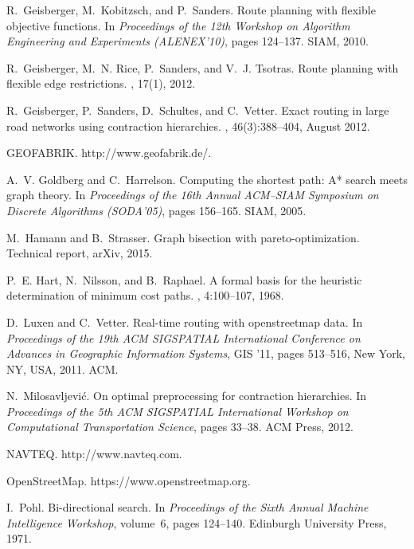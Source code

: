\documentclass{sig-alternate}
\begin{document}
\begin{thebibliography}{10}
R.~Geisberger, M.~Kobitzsch, and P.~Sanders.
\newblock Route planning with flexible objective functions.
\newblock In {\em Proceedings of the 12th Workshop on Algorithm Engineering and
  Experiments (ALENEX'10)}, pages 124--137. SIAM, 2010.

R.~Geisberger, M.~N. Rice, P.~Sanders, and V.~J. Tsotras.
\newblock Route planning with flexible edge restrictions.
, 17(1), 2012.

R.~Geisberger, P.~Sanders, D.~Schultes, and C.~Vetter.
\newblock Exact routing in large road networks using contraction hierarchies.
, 46(3):388--404, August 2012.

GEOFABRIK.
\newblock http://www.geofabrik.de/.

A.~V. Goldberg and C.~Harrelson.
\newblock Computing the shortest path: {A*} search meets graph theory.
\newblock In {\em Proceedings of the 16th Annual {ACM--SIAM} Symposium on
  Discrete Algorithms (SODA'05)}, pages 156--165. SIAM, 2005.

M.~Hamann and B.~Strasser.
\newblock Graph bisection with pareto-optimization.
\newblock Technical report, arXiv, 2015.

P.~E. Hart, N.~Nilsson, and B.~Raphael.
\newblock A formal basis for the heuristic determination of minimum cost paths.
,
  4:100--107, 1968.

D.~Luxen and C.~Vetter.
\newblock Real-time routing with openstreetmap data.
\newblock In {\em Proceedings of the 19th ACM SIGSPATIAL International
  Conference on Advances in Geographic Information Systems}, GIS '11, pages
  513--516, New York, NY, USA, 2011. ACM.

N.~Milosavljevi{\'c}.
\newblock On optimal preprocessing for contraction hierarchies.
\newblock In {\em Proceedings of the 5th ACM SIGSPATIAL International Workshop
  on Computational Transportation Science}, pages 33--38. ACM Press, 2012.

NAVTEQ.
\newblock http://www.navteq.com.

OpenStreetMap.
\newblock https://www.openstreetmap.org.

I.~Pohl.
\newblock Bi-directional search.
\newblock In {\em Proceedings of the Sixth Annual Machine Intelligence
  Workshop}, volume~6, pages 124--140. Edinburgh University Press, 1971.


\end{thebibliography}
\end{document}
